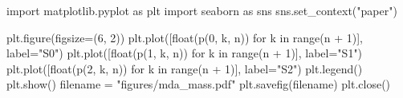 
import matplotlib.pyplot as plt
import seaborn as sns
sns.set_context("paper")

plt.figure(figsize=(6, 2))
plt.plot([float(p(0, k, n)) for k in range(n + 1)], label="S0")
plt.plot([float(p(1, k, n)) for k in range(n + 1)], label="S1")
plt.plot([float(p(2, k, n)) for k in range(n + 1)], label="S2")
plt.legend()
plt.show()
filename = "figures/mda_mass.pdf"
plt.savefig(filename)
plt.close()


